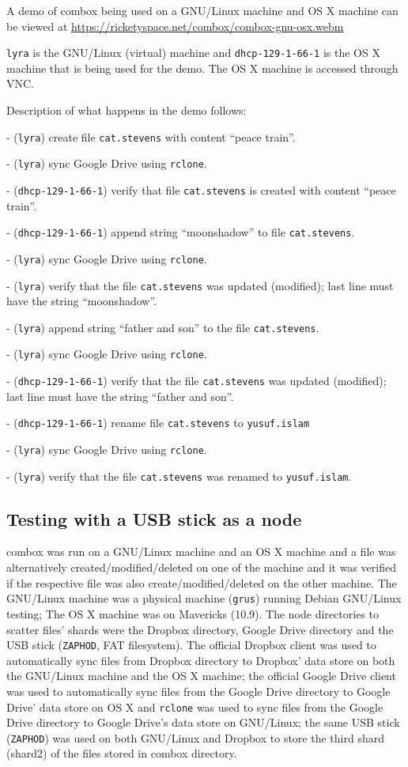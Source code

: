 A demo of combox being used on a GNU/Linux machine and OS X machine
can be viewed at
\url{https://ricketyspace.net/combox/combox-gnu-osx.webm}

\verb+lyra+ is the GNU/Linux (virtual) machine and
\verb+dhcp-129-1-66-1+ is the OS X machine that is being used for the
demo. The OS X machine is accessed through VNC\cite{article:vnc}.

Description of what happens in the demo follows:

- (\verb+lyra+) create file \verb+cat.stevens+ with content ``peace
train''.

- (\verb+lyra+) sync Google Drive using \verb+rclone+.

- (\verb+dhcp-129-1-66-1+) verify that file \verb+cat.stevens+ is
created with content ``peace train''.

- (\verb+dhcp-129-1-66-1+) append string ``moonshadow'' to file
\verb+cat.stevens+.

- (\verb+lyra+) sync Google Drive using \verb+rclone+.

- (\verb+lyra+) verify that the file \verb+cat.stevens+ was updated
(modified); last line must have the string ``moonshadow''.

- (\verb+lyra+) append string ``father and son'' to the file
\verb+cat.stevens+.

- (\verb+lyra+) sync Google Drive using \verb+rclone+.

- (\verb+dhcp-129-1-66-1+) verify that the file \verb+cat.stevens+ was
updated (modified); last line must have the string ``father and son''.

- (\verb+dhcp-129-1-66-1+) rename file \verb+cat.stevens+ to
\verb+yusuf.islam+

- (\verb+lyra+) sync Google Drive using \verb+rclone+.

- (\verb+lyra+) verify that the file \verb+cat.stevens+ was renamed to
\verb+yusuf.islam+.

\subsection{Testing with a USB stick as a node}

combox was run on a GNU/Linux machine and an OS X machine and a file
was alternatively created/modified/deleted on one of the machine and
it was verified if the respective file was also
create/modified/deleted on the other machine. The GNU/Linux machine
was a physical machine (\verb+grus+) running Debian GNU/Linux testing;
The OS X machine was on Mavericks (10.9). The node directories to
scatter files' shards were the Dropbox directory, Google Drive
directory and the USB stick (\verb+ZAPHOD+, FAT filesystem). The
official Dropbox client was used to automatically sync files from
Dropbox directory to Dropbox' data store on both the GNU/Linux machine
and the OS X machine; the official Google Drive client was used to
automatically sync files from the Google Drive directory to Google
Drive' data store on OS X and \verb+rclone+ \cite{program:rclone} was
used to sync files from the Google Drive directory to Google Drive's
data store on GNU/Linux; the same USB stick (\verb+ZAPHOD+) was used
on both GNU/Linux and Dropbox to store the third shard (shard2) of the
files stored in combox directory.

